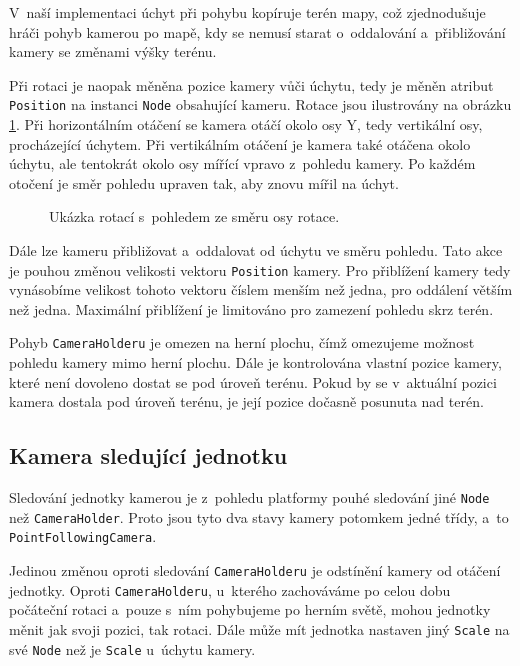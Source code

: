 V~naší implementaci úchyt při pohybu kopíruje terén mapy, což zjednodušuje hráči pohyb kamerou po mapě, kdy se nemusí starat o~oddalování a~přibližování kamery se změnami výšky terénu. 

Při rotaci je naopak měněna pozice kamery vůči úchytu, tedy je měněn atribut \texttt{Position} na instanci \texttt{Node} obsahující kameru. Rotace jsou ilustrovány na obrázku \ref{fig:rotation}. Při horizontálním otáčení se kamera otáčí okolo osy Y, tedy vertikální osy, procházející úchytem.  Při vertikálním otáčení je kamera také otáčena okolo úchytu, ale tentokrát okolo osy mířící vpravo z~pohledu kamery. Po každém otočení je směr pohledu upraven tak, aby znovu mířil na úchyt.

\begin{figure}[h]
	\centering
	\fontsize{8pt}{11pt}\selectfont
	\def\svgwidth{\textwidth}
	
	\caption{Ukázka rotací s~pohledem ze směru osy rotace.}
	\label{fig:rotation}
\end{figure}

Dále lze kameru přibližovat a~oddalovat od úchytu ve směru pohledu. Tato akce je pouhou změnou velikosti vektoru \texttt{Position} kamery. Pro přiblížení kamery tedy vynásobíme velikost tohoto vektoru číslem menším než jedna, pro oddálení větším než jedna. Maximální přiblížení je limitováno pro zamezení pohledu skrz terén.

Pohyb \texttt{CameraHolderu} je omezen na herní plochu, čímž omezujeme možnost pohledu kamery mimo herní plochu. Dále je kontrolována vlastní pozice kamery, které není dovoleno dostat se pod úroveň terénu. Pokud by se v~aktuální pozici kamera dostala pod úroveň terénu, je její pozice dočasně posunuta nad terén.

\subsection{Kamera sledující jednotku}
Sledování jednotky kamerou je z~pohledu platformy pouhé sledování jiné \texttt{Node} než \texttt{CameraHolder}. Proto jsou tyto dva stavy kamery potomkem jedné třídy, a~to \texttt{PointFollowingCamera}. 

Jedinou změnou oproti sledování \texttt{CameraHolderu} je odstínění kamery od otáčení jednotky. Oproti \texttt{CameraHolderu}, u~kterého zachováváme po celou dobu počáteční rotaci a~pouze s~ním pohybujeme po herním světě, mohou jednotky měnit jak svoji pozici, tak rotaci. Dále může mít jednotka nastaven jiný \texttt{Scale} na své \texttt{Node} než je \texttt{Scale} u~úchytu kamery. 

